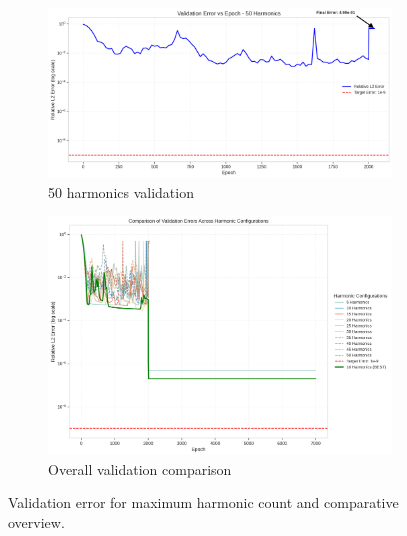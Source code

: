 \begin{figure}[H]
    \centering
    \begin{subfigure}[b]{0.48\textwidth}
        \centering
        \includegraphics[width=\textwidth]{figures/validation_error_50h.png}
        \caption{50 harmonics validation}
    \end{subfigure}
    \hfill
    \begin{subfigure}[b]{0.48\textwidth}
        \centering
        \includegraphics[width=\textwidth]{figures/validation_error.png}
        \caption{Overall validation comparison}
    \end{subfigure}
    \caption{Validation error for maximum harmonic count and comparative overview.}
    \label{fig:validation_50h_overview}
\end{figure}

